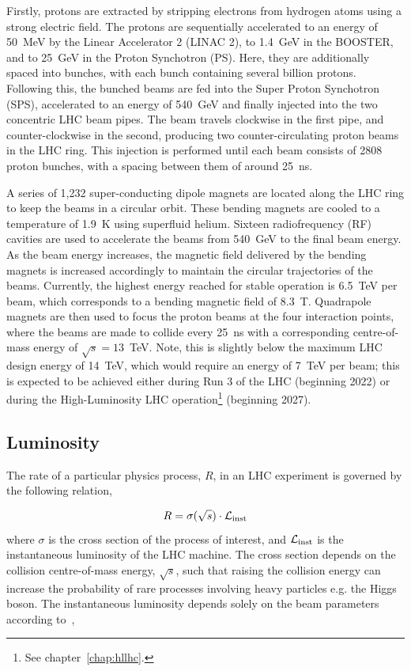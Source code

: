 Firstly, protons are extracted by stripping electrons from hydrogen atoms using a strong electric field. The protons are sequentially accelerated to an energy of 50~MeV by the Linear Accelerator 2 (LINAC 2), to 1.4~GeV in the BOOSTER, and to 25~GeV in the Proton Synchotron (PS). Here, they are additionally spaced into bunches, with each bunch containing several billion protons. Following this, the bunched beams are fed into the Super Proton Synchotron (SPS), accelerated to an energy of 540~GeV and finally injected into the two concentric LHC beam pipes. The beam travels clockwise in the first pipe, and counter-clockwise in the second, producing two counter-circulating proton beams in the LHC ring. This injection is performed until each beam consists of 2808 proton bunches, with a spacing between them of around 25~ns.

A series of 1,232 super-conducting dipole magnets are located along the LHC ring to keep the beams in a circular orbit. These bending magnets are cooled to a temperature of 1.9~K using superfluid helium. Sixteen radiofrequency (RF) cavities are used to accelerate the beams from 540~GeV to the final beam energy. As the beam energy increases, the magnetic field delivered by the bending magnets is increased accordingly to maintain the circular trajectories of the beams. Currently, the highest energy reached for stable operation is 6.5~TeV per beam, which corresponds to a bending magnetic field of 8.3~T. Quadrapole magnets are then used to focus the proton beams at the four interaction points, where the beams are made to collide every 25~ns with a corresponding centre-of-mass energy of $\sqrt{s}=13$~TeV. Note, this is slightly below the maximum LHC design energy of 14~TeV, which would require an energy of 7~TeV per beam; this is expected to be achieved either during Run 3 of the LHC (beginning 2022) or during the High-Luminosity LHC operation\footnote{See chapter~\ref{chap:hllhc}.} (beginning 2027).

\subsection{Luminosity}
The rate of a particular physics process, $R$, in an LHC experiment is governed by the following relation,

\begin{equation}\label{eq:lumi_rate}
    R = \sigma(\sqrt{s}) \cdot \mathcal{L}_{\rm{inst}}
\end{equation}
\noindent
where $\sigma$ is the cross section of the process of interest, and $\mathcal{L}_{\rm{inst}}$ is the instantaneous luminosity of the LHC machine. The cross section depends on the collision centre-of-mass energy, $\sqrt{s}$, such that raising the collision energy can increase the probability of rare processes involving heavy particles e.g. the Higgs boson. The instantaneous luminosity depends solely on the beam parameters according to~\cite{1748-0221-3-08-S08001},

